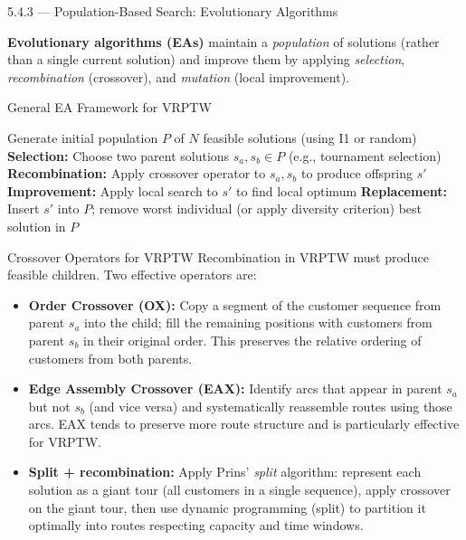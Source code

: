 \documentclass[aspectratio=169,10pt]{beamer}
\begin{document}
\begin{frame}[allowframebreaks]{5.4.3 --- Population-Based Search: Evolutionary Algorithms}

\textbf{Evolutionary algorithms (EAs)} maintain a \emph{population} of solutions
(rather than a single current solution) and improve them by applying
\emph{selection}, \emph{recombination} (crossover), and \emph{mutation}
(local improvement).

\begin{block}{General EA Framework for VRPTW}
\begin{algorithmic}[1]
\State Generate initial population $P$ of $N$ feasible solutions (using I1 or random)
\Repeat
  \State \textbf{Selection:} Choose two parent solutions $s_a, s_b \in P$
    (e.g., tournament selection)
  \State \textbf{Recombination:} Apply crossover operator to $s_a, s_b$ to
    produce offspring $s'$
  \State \textbf{Improvement:} Apply local search to $s'$ to find local optimum
  \State \textbf{Replacement:} Insert $s'$ into $P$; remove worst individual
    (or apply diversity criterion)
\State \Return best solution in $P$
\end{algorithmic}
\end{block}

\framebreak

\begin{block}{Crossover Operators for VRPTW}
Recombination in VRPTW must produce feasible children.  Two effective operators are:

\begin{itemize}
  \item \textbf{Order Crossover (OX):} Copy a segment of the customer sequence from
    parent $s_a$ into the child; fill the remaining positions with customers from
    parent $s_b$ in their original order.  This preserves the relative ordering of
    customers from both parents.

  \item \textbf{Edge Assembly Crossover (EAX):} Identify arcs that appear in parent
    $s_a$ but not $s_b$ (and vice versa) and systematically reassemble routes using
    those arcs.  EAX tends to preserve more route structure and is particularly
    effective for VRPTW.

  \item \textbf{Split + recombination:} Apply Prins' \emph{split} algorithm:
    represent each solution as a giant tour (all customers in a single sequence),
    apply crossover on the giant tour, then use dynamic programming (split) to
    partition it optimally into routes respecting capacity and time windows.
\end{itemize}
\end{block}


\end{frame}
\end{document}
